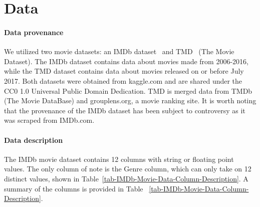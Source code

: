 \newpage
\section{Data}
    \begin{multicols}{2}
        \paragraph{Data provenance}
            We utilized two movie datasets: an IMDb dataset~\cite{data:IMDb} and
                TMD~\cite{data:TMD} (The Movie Dataset).
            The IMDb dataset contains data about movies made from 2006-2016, while the TMD
                dataset contains data about movies released on or before July 2017.
            Both datasets were obtained from kaggle.com and are shared under the CC0 1.0
                Universal Public Domain Dedication.
            TMD is merged data from TMDb (The Movie DataBase) and grouplens.org, a movie
                ranking site.
            It is worth noting that the provenance of the IMDb dataset has been subject to
                controversy as it was scraped from IMDb.com.

        \paragraph{Data description}
            The IMDb movie dataset contains 12 columns with string or floating point
                values.
            The only column of note is the Genre column, which can only take on 12 distinct
                values, shown in Table~\ref{tab-IMDb-Movie-Data-Column-Description}.
            A summary of the columns is provided in Table
                ~\ref{tab-IMDb-Movie-Data-Column-Description}.
    \end{multicols}

